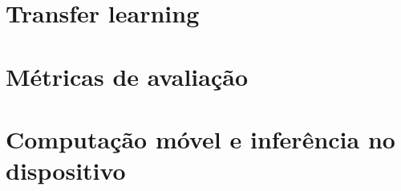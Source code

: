 \section{Transfer learning}


\section{Métricas de avaliação}


\section{Computação móvel e inferência no dispositivo}

